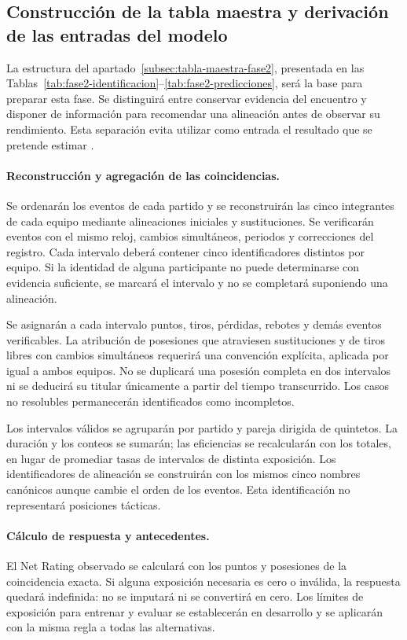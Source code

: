 \subsection{Construcción de la tabla maestra y derivación de las entradas del modelo}
\label{subsec:construccion-tablas-fase2}
La estructura del apartado~\ref{subsec:tabla-maestra-fase2}, presentada en las Tablas~\ref{tab:fase2-identificacion}--\ref{tab:fase2-predicciones}, será la base para preparar esta fase. Se distinguirá entre conservar evidencia del encuentro y disponer de información para recomendar una alineación antes de observar su rendimiento. Esta separación evita utilizar como entrada el resultado que se pretende estimar \cite{sklearnCommonPitfallsPonderacion}.

\paragraph*{Reconstrucción y agregación de las coincidencias.}
Se ordenarán los eventos de cada partido y se reconstruirán las cinco integrantes de cada equipo mediante alineaciones iniciales y sustituciones. Se verificarán eventos con el mismo reloj, cambios simultáneos, periodos y correcciones del registro. Cada intervalo deberá contener cinco identificadores distintos por equipo. Si la identidad de alguna participante no puede determinarse con evidencia suficiente, se marcará el intervalo y no se completará suponiendo una alineación.

Se asignarán a cada intervalo puntos, tiros, pérdidas, rebotes y demás eventos verificables. La atribución de posesiones que atraviesen sustituciones y de tiros libres con cambios simultáneos requerirá una convención explícita, aplicada por igual a ambos equipos. No se duplicará una posesión completa en dos intervalos ni se deducirá su titular únicamente a partir del tiempo transcurrido. Los casos no resolubles permanecerán identificados como incompletos.

Los intervalos válidos se agruparán por partido y pareja dirigida de quintetos. La duración y los conteos se sumarán; las eficiencias se recalcularán con los totales, en lugar de promediar tasas de intervalos de distinta exposición. Los identificadores de alineación se construirán con los mismos cinco nombres canónicos aunque cambie el orden de los eventos. Esta identificación no representará posiciones tácticas.

\paragraph*{Cálculo de respuesta y antecedentes.}
El Net Rating observado se calculará con los puntos y posesiones de la coincidencia exacta. Si alguna exposición necesaria es cero o inválida, la respuesta quedará indefinida: no se imputará ni se convertirá en cero. Los límites de exposición para entrenar y evaluar se establecerán en desarrollo y se aplicarán con la misma regla a todas las alternativas.

